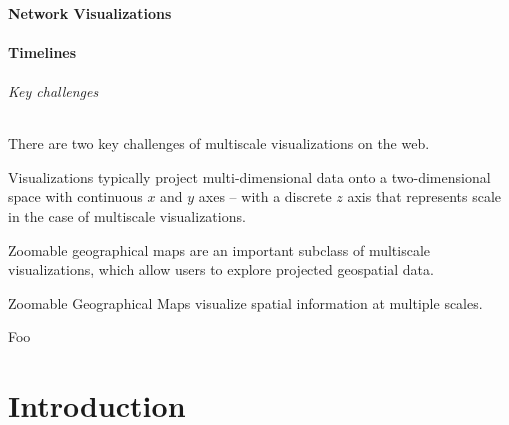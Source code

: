 \documentclass[11pt, oneside]{report}   	%
\begin{document}
\subsection{Network Visualizations}

\subsection{Timelines}







\paragraph{Key challenges}
There are two key challenges of multiscale visualizations on the web. 

Visualizations typically project multi-dimensional data onto a two-dimensional space with continuous $x$ and $y$ axes -- with a discrete $z$ axis that represents scale in the case of multiscale visualizations. 






Zoomable geographical maps are an important subclass of multiscale visualizations, which allow users to explore projected geospatial data. 





Zoomable Geographical Maps visualize spatial information at multiple scales.



Foo


\part{Introduction}
\end{document}
